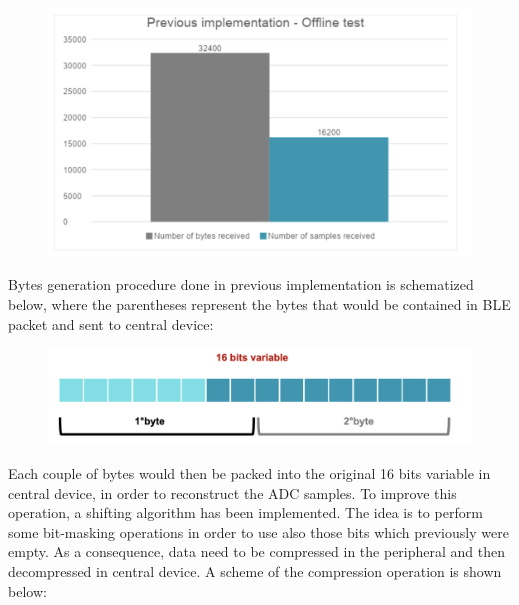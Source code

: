 \documentclass{Configuration_Files/PoliMi3i_thesis}
\begin{document}
\begin{figure}[H]
    \centering
    \includegraphics[scale=0.7]{Shift Algorithm/Screenshot 2024-07-22 at 22.31.21.png}
    \label{fig:pairing_procedure}
\end{figure}

Bytes generation procedure done in previous implementation is schematized below, where the parentheses represent the bytes that would be contained in BLE packet and sent to central device:

\begin{figure}[H]
    \centering
    \includegraphics[scale=0.7]{Shift Algorithm/Screenshot 2024-07-22 at 22.31.29.png}
    \label{fig:pairing_procedure}
\end{figure}


Each couple of bytes would then be packed into the original 16 bits variable in central device, in order to reconstruct the ADC samples. To improve this operation, a shifting algorithm has been implemented. The idea is to perform some bit-masking operations in order to use also those bits which previously were empty. As a consequence, data need to be compressed in the peripheral and then decompressed in central device. A scheme of the compression operation is shown below:
\end{document}
